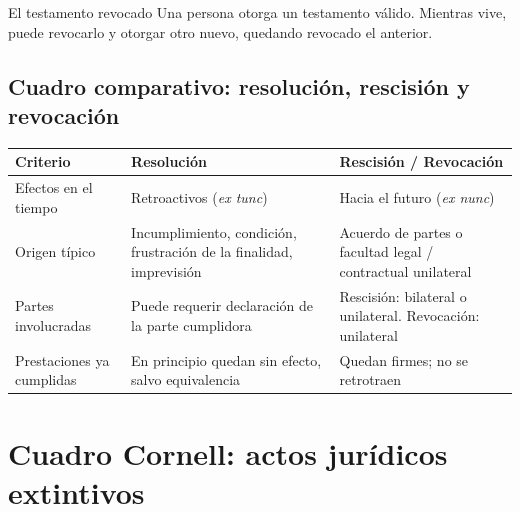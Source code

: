 \documentclass[12pt,oneside]{book}
\begin{document}
\begin{example}{El testamento revocado}
Una persona otorga un testamento válido. Mientras vive, puede revocarlo y otorgar otro nuevo, quedando revocado el anterior.
\end{example}

\subsection{Cuadro comparativo: resolución, rescisión y revocación}

\begin{table}[H]
\centering
\begin{tabularx}{\textwidth}{
    >{\raggedright\arraybackslash}p{3.0cm}
    >{\raggedright\arraybackslash}X
    >{\raggedright\arraybackslash}X
}
\toprule
\textbf{Criterio} & \textbf{Resolución} & \textbf{Rescisión / Revocación} \\
\midrule
Efectos en el tiempo & Retroactivos (\textit{ex tunc}) & Hacia el futuro (\textit{ex nunc}) \\
\addlinespace
Origen típico & Incumplimiento, condición, frustración de la finalidad, imprevisión & Acuerdo de partes o facultad legal / contractual unilateral \\
\addlinespace
Partes involucradas & Puede requerir declaración de la parte cumplidora & Rescisión: bilateral o unilateral. Revocación: unilateral \\
\addlinespace
Prestaciones ya cumplidas & En principio quedan sin efecto, salvo equivalencia & Quedan firmes; no se retrotraen \\
\bottomrule
\end{tabularx}
\end{table}

\section{Cuadro Cornell: actos jurídicos extintivos}
\end{document}
